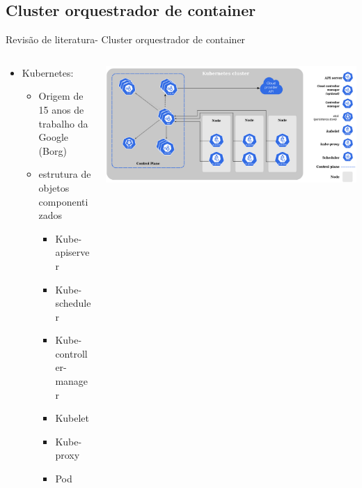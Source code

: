 \documentclass[10pt,brazil]{beamer}
\theoremstyle{definition}
\begin{document}
\subsection{Cluster orquestrador de container}

\begin{frame}{Revisão de literatura- Cluster orquestrador de container}
  \begin{columns}
    \begin{column}{0.5\textwidth}
      \begin{itemize}
        \item Kubernetes\textregistered:
              \begin{itemize}
                \item Origem de 15 anos de trabalho da Google (Borg) \cite{verma_large-scale_2015}
                \item estrutura de objetos componentizados \cite{kubernetes2022}
                      \begin{itemize}
                        \item Kube-apiserver
                        \item Kube-scheduler
                        \item Kube-controller-manager
                        \item Kubelet
                        \item Kube-proxy
                        \item Pod
                      \end{itemize}
              \end{itemize}
      \end{itemize}
    \end{column}
    \begin{column}{0.5\textwidth}  %
      \begin{center}
        \includegraphics[width=1\textwidth]{kubeadm-node.png}
      \end{center}
    \end{column}
  \end{columns}
\end{frame}
\end{document}
